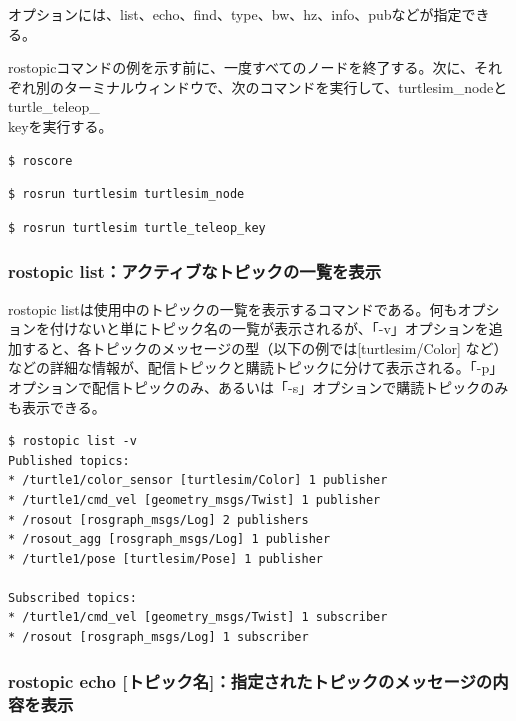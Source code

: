オプションには、list、echo、find、type、bw、hz、info、pubなどが指定できる。

rostopicコマンドの例を示す前に、一度すべてのノードを終了する。次に、それぞれ別のターミナルウィンドウで、次のコマンドを実行して、turtlesim\_nodeとturtle\_teleop\_\\keyを実行する。

\begin{lstlisting}[language=ROS]
$ roscore
\end{lstlisting}

\begin{lstlisting}[language=ROS]
$ rosrun turtlesim turtlesim_node
\end{lstlisting}

\begin{lstlisting}[language=ROS]
$ rosrun turtlesim turtle_teleop_key
\end{lstlisting}

\subsubsection{rostopic list：アクティブなトピックの一覧を表示}

rostopic listは使用中のトピックの一覧を表示するコマンドである。何もオプションを付けないと単にトピック名の一覧が表示されるが、「-v」オプションを追加すると、各トピックのメッセージの型（以下の例では[turtlesim/Color] など）などの詳細な情報が、配信トピックと購読トピックに分けて表示される。「-p」オプションで配信トピックのみ、あるいは「-s」オプションで購読トピックのみも表示できる。

\begin{lstlisting}[language=ROS]
$ rostopic list -v
Published topics:
* /turtle1/color_sensor [turtlesim/Color] 1 publisher
* /turtle1/cmd_vel [geometry_msgs/Twist] 1 publisher
* /rosout [rosgraph_msgs/Log] 2 publishers
* /rosout_agg [rosgraph_msgs/Log] 1 publisher
* /turtle1/pose [turtlesim/Pose] 1 publisher

Subscribed topics:
* /turtle1/cmd_vel [geometry_msgs/Twist] 1 subscriber
* /rosout [rosgraph_msgs/Log] 1 subscriber
\end{lstlisting}

\subsubsection{rostopic echo [トピック名]：指定されたトピックのメッセージの内容を表示}

